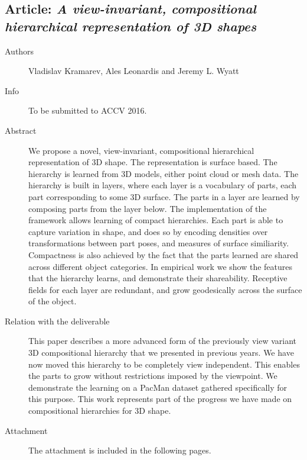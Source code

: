 \documentclass[a4paper,11pt,pdf]{../templates/pacmanreport}
\begin{document}
\subsection{Article: \em A view-invariant, compositional hierarchical representation of 3D shapes}
\begin{description}
    \item[Authors] Vladislav Kramarev, Ales Leonardis and Jeremy L. Wyatt
    \item[Info] To be submitted to ACCV 2016.
    \item[Abstract] We propose a novel, view-invariant, compositional hierarchical representation of 3D shape. The representation is surface based. The hierarchy is learned from 3D models, either point cloud or mesh data. The hierarchy is built in layers, where each layer is a vocabulary of parts, each part corresponding to some 3D surface. The parts in a layer are learned by composing parts from the layer below. The implementation of the framework allows learning of compact hierarchies. Each part is able to capture variation in shape, and does so by encoding densities over transformations between part poses, and measures of surface similiarity. Compactness is also achieved by the fact that the parts learned are shared across different object categories. In empirical work we show the features that the hierarchy learns, and demonstrate their shareability. Receptive fields for each layer are redundant, and grow geodesically across the surface of the object.
    \item [Relation with the deliverable] This paper describes a more advanced form of the previously view variant 3D compositional hierarchy that we presented in previous years. We have now moved this hierarchy to be completely view independent. This enables the parts to grow without restrictions imposed by the viewpoint. We demonstrate the learning on a PacMan dataset gathered specifically for this purpose. This work represents part of the progress we have made on compositional hierarchies for 3D shape.
    \item[Attachment] The attachment is included in the following pages. %
\end{description}


\newpage
\end{document}

